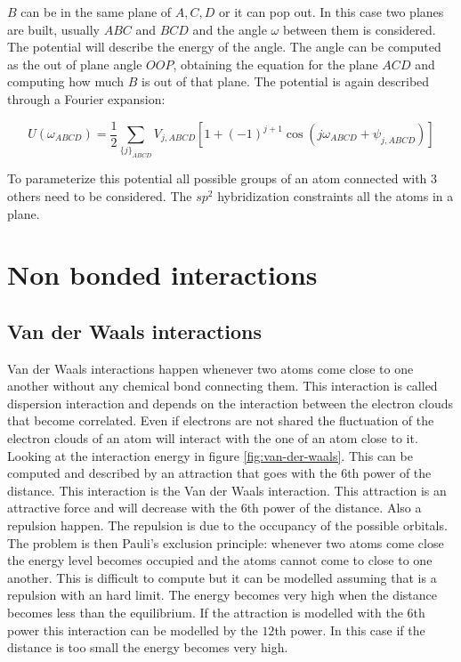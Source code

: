 		$B$ can be in the same plane of $A, C, D$ or it can pop out.
		In this case two planes are built, usually $ABC$ and $BCD$ and the angle $\omega$ between them is considered.
		The potential will describe the energy of the angle.
		The angle can be computed as the out of plane angle $OOP$, obtaining the equation for the plane $ACD$ and computing how much $B$ is out of that plane.
		The potential is again described through a Fourier expansion:

		$$U(\omega_{ABCD}) = \frac{1}{2}\sum\limits_{\{j\}_{ABCD}}V_{j,ABCD}[1+(-1)^{j+1}\cos(j\omega_{ABCD}+\psi_{j,ABCD})]$$

		To parameterize this potential all possible groups of an atom connected with $3$ others need to be considered.
		The $sp^2$ hybridization constraints all the atoms in a plane.

\section{Non bonded interactions}

	\subsection{Van der Waals interactions}
	Van der Waals interactions happen whenever two atoms come close to one another without any chemical bond connecting them.
	This interaction is called dispersion interaction and depends on the interaction between the electron clouds that become correlated.
	Even if electrons are not shared the fluctuation of the electron clouds of an atom will interact with the one of an atom close to it.
	Looking at the interaction energy in figure \ref{fig:van-der-waals}.
	This can be computed and described by an attraction that goes with the $6$th power of the distance.
	This interaction is the Van der Waals interaction.
	This attraction is an attractive force and will decrease with the $6$th power of the distance.
	Also a repulsion happen.
	The repulsion is due to the occupancy of the possible orbitals.
	The problem is then Pauli's exclusion principle: whenever two atoms come close the energy level becomes occupied and the atoms cannot come to close to one another.
	This is difficult to compute but it can be modelled assuming that is a repulsion with an hard limit.
	The energy becomes very high when the distance becomes less than the equilibrium.
	If the attraction is modelled with the $6$th power this interaction can be modelled by the $12$th power.
	In this case if the distance is too small the energy becomes very high.

